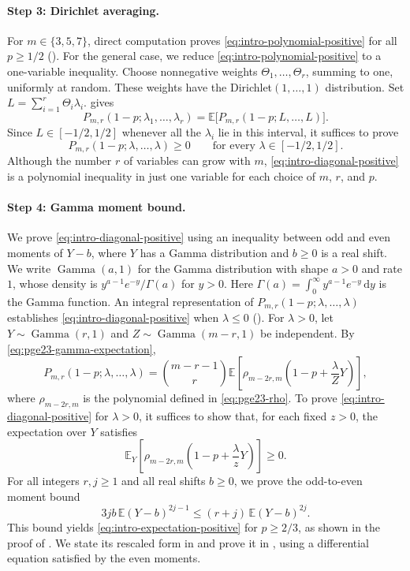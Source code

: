 \documentclass[11pt]{article}
\theoremstyle{remark}
\numberwithin{equation}{section}
\newcommand{\dd}{\,\mathrm d}
\newcommand{\E}{\mathbb E}
\newcommand{\GammaLaw}{\operatorname{Gamma}}
\begin{document}
\paragraph{Step 3: Dirichlet averaging.}
For $m\in\{3,5,7\}$, direct computation proves \eqref{eq:intro-polynomial-positive} for all $p\ge1/2$ ().
For the general case, we reduce \eqref{eq:intro-polynomial-positive} to a one-variable inequality.
Choose nonnegative weights $\Theta_1,\ldots,\Theta_r$, summing to one, uniformly at random.
These weights have the Dirichlet$(1,\ldots,1)$ distribution.
Set $L=\sum_{i=1}^r\Theta_i\lambda_i$.
 gives
\[
  P_{m,r}(1-p;\lambda_1,\ldots,\lambda_r)
  =\E\bigl[P_{m,r}(1-p;L,\ldots,L)\bigr].
\]
Since $L\in[-1/2,1/2]$ whenever all the $\lambda_i$ lie in this interval, it suffices to prove
\begin{equation}\label{eq:intro-diagonal-positive}
  P_{m,r}(1-p;\lambda,\ldots,\lambda)\ge0
  \qquad\text{for every }\lambda\in[-1/2,1/2].
\end{equation}
Although the number $r$ of variables can grow with $m$, \eqref{eq:intro-diagonal-positive} is a polynomial inequality in just one variable for each choice of $m$, $r$, and $p$.

\paragraph{Step 4: Gamma moment bound.}
We prove \eqref{eq:intro-diagonal-positive} using an inequality
between odd and even moments of $Y-b$, where $Y$ has a Gamma distribution
and $b\ge0$ is a real shift.
We write $\GammaLaw(a,1)$ for the Gamma distribution with shape $a>0$
and rate $1$, whose density is $y^{a-1}e^{-y}/\Gamma(a)$ for $y>0$.
Here $\Gamma(a)=\int_0^\infty y^{a-1}e^{-y}\dd y$ is the Gamma function.
An integral representation of $P_{m,r}(1-p;\lambda,\ldots,\lambda)$ establishes \eqref{eq:intro-diagonal-positive} when $\lambda\le0$ ().
For $\lambda>0$, let $Y\sim\GammaLaw(r,1)$ and
$Z\sim\GammaLaw(m-r,1)$ be independent.
By \eqref{eq:pge23-gamma-expectation},
\[
  P_{m,r}(1-p;\lambda,\ldots,\lambda)
  =\binom{m-r-1}{r}
    \E\!\left[\rho_{m-2r,m}\!\left(1-p+\frac{\lambda}{Z}Y\right)\right],
\]
where $\rho_{m-2r,m}$ is the polynomial defined in \eqref{eq:pge23-rho}.
To prove \eqref{eq:intro-diagonal-positive} for $\lambda>0$, it suffices to show that, for each fixed $z>0$, the expectation over $Y$ satisfies
\begin{equation}\label{eq:intro-expectation-positive}
  \E_Y\!\left[\rho_{m-2r,m}\!\left(1-p+\frac{\lambda}{z}Y\right)\right]\ge0.
\end{equation}
For all integers $r,j\ge1$ and all real shifts $b\ge0$, we prove the odd-to-even moment bound
\begin{equation}\label{eq:intro-moment-bound}
  3jb\,\E(Y-b)^{2j-1}\le(r+j)\,\E(Y-b)^{2j}.
\end{equation}
This bound yields \eqref{eq:intro-expectation-positive} for $p\ge2/3$,
as shown in the proof of .
We state its rescaled form in  and prove it in
, using a differential equation satisfied by the even moments.
\end{document}
